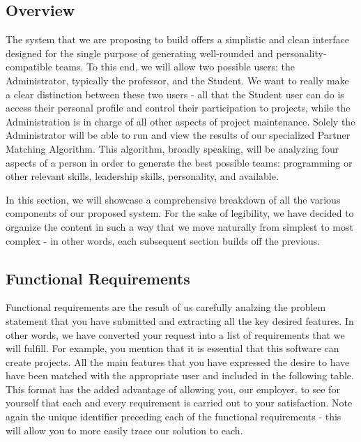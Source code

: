 \documentclass[12pt,letterpaper]{article}
\begin{document}
\subsection{Overview}

The system that we are proposing to build offers a simplistic and clean interface designed for the single purpose of generating 
well-rounded and personality-compatible teams. To this end, we will allow two possible users: the Administrator, typically the professor,
and the Student. We want to really make a clear distinction between these two users - all that the Student user can do is access their
personal profile and control their participation to projects, while the Administration is in charge of all other aspects of project maintenance. 
Solely the Administrator will be able to run and view the results of our specialized Partner Matching Algorithm. This algorithm, broadly speaking,
will be analyzing four aspects of a person in order to generate the best possible teams:  programming or other relevant skills, leadership skills,
personality, and available. 

In this section, we will showcase a comprehensive breakdown of all the various components of our proposed system. For the sake of 
legibility, we have decided to organize the content in such a way that we move naturally from simplest to most complex - in other words,
each subsequent section builds off the previous. 

\subsection{Functional Requirements}

Functional requirements are the result of us carefully analzing the problem statement that you have submitted and extracting all the key 
desired features. In other words, we have converted your request into a list of requirements that we will fulfill. For example, you mention that
it is essential that this software can create projects. All the main features that you have expressed the desire to have have been matched with
the appropriate user and included in the following table. This format has the added advantage of allowing you, our employer, to see for 
yourself that each and every requirement is carried out to your satisfaction. Note again the unique identifier preceding each of the functional 
requirements - this will allow you to more easily trace our solution to each. 
\end{document}
